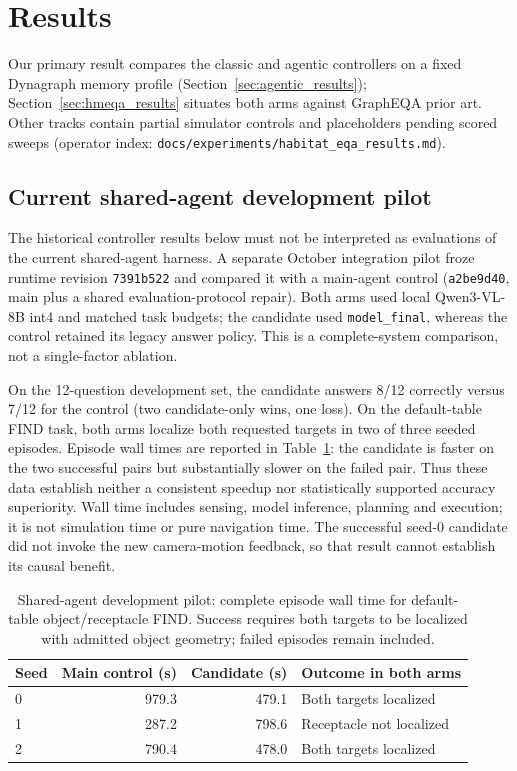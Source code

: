 \section{Results}
\label{sec:results}

Our primary result compares the classic and agentic controllers on a fixed Dynagraph memory profile (Section~\ref{sec:agentic_results}); Section~\ref{sec:hmeqa_results} situates both arms against GraphEQA prior art. Other tracks contain partial simulator controls and placeholders pending scored sweeps (operator index: \texttt{docs/experiments/habitat\_eqa\_results.md}).

\subsection{Current shared-agent development pilot}
\label{sec:shared_agent_pilot}

The historical controller results below must not be interpreted as evaluations
of the current shared-agent harness. A separate October integration pilot froze
runtime revision \texttt{7391b522} and compared it with a main-agent control
(\texttt{a2be9d40}, main plus a shared evaluation-protocol repair). Both arms
used local Qwen3-VL-8B int4 and matched task budgets; the candidate used
\texttt{model\_final}, whereas the control retained its legacy answer policy.
This is a complete-system comparison, not a single-factor ablation.

On the 12-question development set, the candidate answers 8/12 correctly versus
7/12 for the control (two candidate-only wins, one loss). On the default-table
FIND task, both arms localize both requested targets in two of three seeded
episodes. Episode wall times are reported in Table~\ref{tab:shared_agent_pilot}:
the candidate is faster on the two successful pairs but substantially slower
on the failed pair. Thus these data establish neither a consistent speedup nor
statistically supported accuracy superiority. Wall time includes sensing,
model inference, planning and execution; it is not simulation time or pure
navigation time. The successful seed-0 candidate did not invoke the new
camera-motion feedback, so that result cannot establish its causal benefit.

\begin{table}[t]
  \centering
  \caption{Shared-agent development pilot: complete episode wall time for
  default-table object/receptacle FIND. Success requires both targets to be
  localized with admitted object geometry; failed episodes remain included.}
  \label{tab:shared_agent_pilot}
  \small
  \begin{tabular}{@{}lrrl@{}}
    \toprule
    Seed & Main control (s) & Candidate (s) & Outcome in both arms \\
    \midrule
    0 & 979.3 & 479.1 & Both targets localized \\
    1 & 287.2 & 798.6 & Receptacle not localized \\
    2 & 790.4 & 478.0 & Both targets localized \\
    \bottomrule
  \end{tabular}
\end{table}

